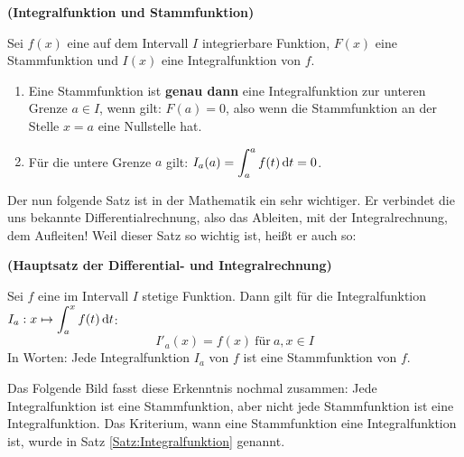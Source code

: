 \documentclass[ngerman, 12pt]{nssheetxea}
\begin{document}
\begin{theorem} \textbf{(Integralfunktion und Stammfunktion)} \par
Sei $f(x)$ eine auf dem Intervall $I$ integrierbare Funktion, $F(x)$ eine Stammfunktion und $I(x)$ eine Integralfunktion von $f$.
\begin{enumerate}
\item Eine Stammfunktion ist \textbf{genau dann} eine Integralfunktion zur unteren Grenze $a\in I$, wenn gilt: $F(a)=0$, also wenn die Stammfunktion an der Stelle $x=a$ eine Nullstelle hat.
\item Für die untere Grenze $a$ gilt: $\displaystyle I_a(a)=\int_a^af(t)\mathop{}\!\mathrm{d} t = 0$.
\end{enumerate}
\label{Satz:Integralfunktion}
\end{theorem}

Der nun folgende Satz ist in der Mathematik ein sehr wichtiger. Er verbindet die uns bekannte Differentialrechnung, also das Ableiten, mit der Integralrechnung, dem Aufleiten! Weil dieser Satz so wichtig ist, heißt er auch so:

\begin{theorem} \textbf{(Hauptsatz der Differential- und Integralrechnung)} \par
Sei $f$ eine im Intervall $I$ stetige Funktion. Dann gilt für die Integralfunktion $\displaystyle I_a:x\mapsto \int_a^xf(t)\mathop{}\!\mathrm{d} t$:
\[ I'_a(x)=f(x) \ \text{für} \ a,x \in I \]
In Worten: Jede Integralfunktion $I_a$ von $f$ ist eine Stammfunktion von $f$. 
\label{Satz:HDI}
\end{theorem}

Das Folgende Bild fasst diese Erkenntnis nochmal zusammen: Jede Integralfunktion ist eine Stammfunktion, aber nicht jede Stammfunktion ist eine Integralfunktion. Das Kriterium, wann eine Stammfunktion eine Integralfunktion ist, wurde in Satz \ref{Satz:Integralfunktion} genannt.

\begin{center}
\end{center}
\end{document}
